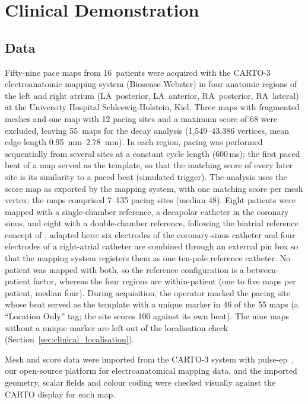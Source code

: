 \documentclass[a4paper,fleqn]{cas-dc}
\begin{document}
\section{Clinical Demonstration}\label{sec:clinical}

\subsection{Data}\label{sec:cohort}

Fifty-nine pace maps from 16~patients were acquired with the CARTO-3
electroanatomic mapping system (Biosense Webster) in four anatomic
regions of the left and right atrium (LA~posterior, LA~anterior,
RA~posterior, RA~lateral) at the University Hospital
Schleswig-Holstein, Kiel.  Three maps with fragmented meshes and one map
with 12 pacing sites and a maximum score of 68 were excluded, leaving
55~maps for the decay analysis (1{,}549--43{,}386 vertices, mean edge
length \SIrange{0.95}{2.78}{\milli\metre}).  In each region, pacing was
performed sequentially from several sites at a constant cycle length
(600\,ms); the first paced beat of a map served as the template, so
that the matching score of every later site is its similarity to a
paced beat (simulated trigger).  The analysis uses the score map as
exported by the mapping system, with one matching score per mesh vertex;
the maps comprised 7--135 pacing sites (median 48).  Eight patients were
mapped with a single-chamber reference, a decapolar catheter in the
coronary sinus, and eight with a double-chamber reference, following the
biatrial reference concept of \citet{lian2025}, adapted here: six
electrodes of the coronary-sinus catheter and four electrodes of a
right-atrial catheter are combined through an external pin box so that
the mapping system registers them as one ten-pole reference catheter.
No patient was mapped with both, so the reference configuration is a
between-patient factor, whereas the four regions are within-patient (one
to five maps per patient, median four).
During acquisition, the operator marked the pacing site whose beat
served as the template with a unique marker in 46 of the 55 maps (a
``Location Only'' tag; the site scores 100 against its own beat).  The
nine maps without a unique marker are left out of the localisation
check (Section~\ref{sec:clinical_localisation}).

Mesh and score data were imported from the CARTO-3 system with
pulse-ep~\citep{willert2026pulseep}, our open-source platform for
electroanatomical mapping data, and the imported
geometry, scalar fields and colour coding were checked visually against
the CARTO display for each map.
\end{document}
